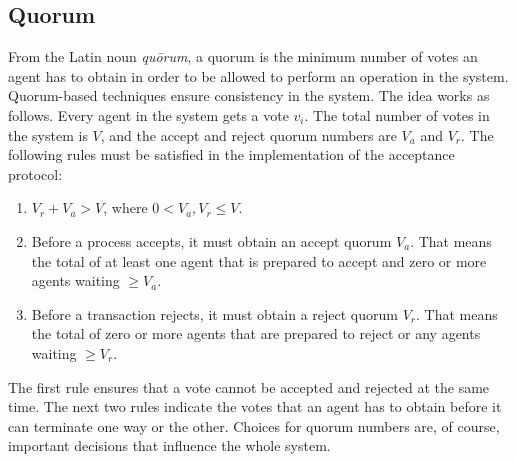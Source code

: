 \subsection{Quorum}
From the Latin noun \textit{qu\=orum}, a quorum is the minimum number of votes an agent has to obtain in order to be allowed to perform an operation in the system. Quorum-based techniques ensure consistency in the system.  The idea works as follows. Every agent in the system gets a vote $v_{i}$. The total number of votes in the system is $V$, and the accept and reject quorum numbers are $V_{a}$ and $V_{r}$. The following rules must be satisfied in the implementation of the acceptance protocol:
\begin{enumerate}
	\item $V_{r} + V_{a} > V$, where $0 < V_{a}, V_{r} \leq  V$.
	\item Before a process accepts, it must obtain an accept quorum $V_{a}$. That means the total of at least one agent that is prepared to accept and zero or more agents waiting $\geq V_{a}$.
	\item Before a transaction rejects, it must obtain a reject quorum $V_{r}$. That means the total of zero or more agents that are prepared to reject or any agents waiting $\geq  V_{r}$.
\end{enumerate}
The first rule ensures that a vote cannot be accepted and rejected at the same time. The next two rules indicate the votes that an agent has to obtain before it can terminate one way or the other. Choices for quorum numbers are, of course, important decisions that influence the whole system.~\cite{Ozsu1999}
